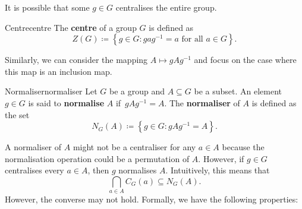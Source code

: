 \documentclass[math]{amznotes}
\theoremstyle{remark}
\newcommand{\0}{\mathbf{0}}
\newcommand{\1}{\mathbf{1}}
\begin{document}
It is possible that some $g \in G$ centralises the entire group.
\begin{dfnbox}{Centre}{centre}
    The {\color{red} \textbf{centre}} of a group $G$ is defined as 
    \begin{equation*}
        Z\left(G\right) \coloneqq \left\{g \in G \colon gag^{-1} = a \textrm{ for all } a \in G\right\}.
    \end{equation*}
\end{dfnbox}
Similarly, we can consider the mapping $A \mapsto gAg^{-1}$ and focus on the case where this map is an inclusion map.
\begin{dfnbox}{Normaliser}{normaliser}
    Let $G$ be a group and $A \subseteq G$ be a subset. An element $g \in G$ is said to {\color{red} \textbf{normalise}} $A$ if~$gAg^{-1} = A$. The {\color{red} \textbf{normaliser}} of $A$ is defined as the set
    \begin{equation*}
        N_G\left(A\right) \coloneqq \left\{g \in G \colon gAg^{-1} = A\right\}.
    \end{equation*}
\end{dfnbox}
A normaliser of $A$ might not be a centraliser for any $a \in A$ because the normalisation operation could be a permutation of $A$. However, if $g \in G$ centralises every $a \in A$, then $g$ normalises $A$. Intuitively, this means that 
\begin{equation*}
    \bigcap_{a \in A}C_G\left(a\right) \subseteq N_G\left(A\right).
\end{equation*}
However, the converse may not hold. Formally, we have the following properties:
\end{document}
